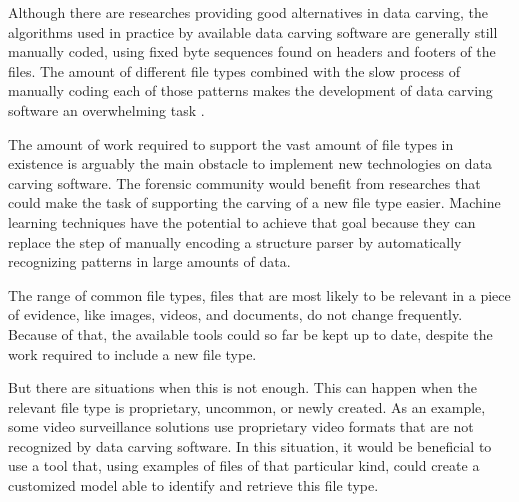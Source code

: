 Although there are researches providing good alternatives in data carving, the algorithms used in practice by available data carving software are generally still manually coded, using fixed byte sequences found on headers and footers of the files. The amount of different file types combined with the slow process of manually coding each of those patterns makes the development of data carving software an overwhelming task \cite{mcdaniel_content_2003}. 



The amount of work required to support the vast amount of file types in existence is arguably the main obstacle to implement new technologies on data carving software. The forensic community would benefit from researches that could make the task of supporting the carving of a new file type easier. Machine learning techniques have the potential to achieve that goal because they can replace the step of manually encoding a structure parser by automatically recognizing patterns in large amounts of data.

The range of common file types, files that are most likely to be relevant in a piece of evidence, like images, videos, and documents, do not change frequently. Because of that, the available tools could so far be kept up to date, despite the work required to include a new file type.

But there are situations when this is not enough. This can happen when the relevant file type is proprietary, uncommon, or newly created. As an example, some video surveillance solutions use proprietary video formats that are not recognized by data carving software. In this situation, it would be beneficial to use a tool that, using examples of files of that particular kind, could create a customized model able to identify and retrieve this file type.

